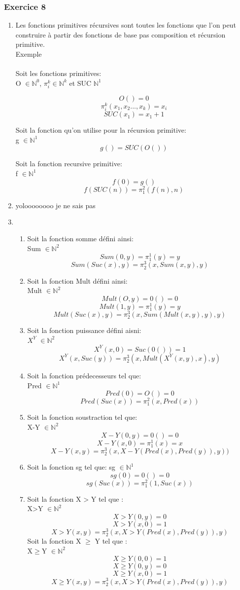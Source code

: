 \documentclass{article}
\begin{document}
\subsubsection{Exercice 8}
\begin{enumerate}
\item Les fonctions primitives récursives sont toutes les fonctions que l'on peut construire à partir des fonctions de base pas composition et récursion primitive.\\

  Exemple\\ \\
Soit les fonctions primitives: \\
O $\in \mathbb{N}^0$, $\pi_i^k \in \mathbb{N}^k$ et SUC $\mathbb{N}^1$ 

 \[O() = 0 \] 
\[\pi_i^k(x_1,x_2...,x_k) = x_i \] 
\[SUC(x_1) = x_1 + 1 \] 

Soit la fonction qu'on utilise pour la récursion primitive:\\
g $\in \mathbb{N}^1$
\[g() = SUC(O()) \]

Soit la fonction recursive primitive:\\
f $\in \mathbb{N}^1$
\[f(0) = g()\]
\[f(SUC(n)) = \pi_1^2(f(n),n)\]
  
\item  yoloooooooo je ne sais pas 
\item \begin{enumerate}\item Soit la fonction somme défini ainsi:\\
 Sum $\in \mathbb{N}^2$ 
\[Sum(0,y) = \pi_1^1(y) = y \]
\[Sum(Suc(x),y) = \pi_2^3(x,Sum(x,y),y)\]
\item Soit la fonction Mult défini ainsi: \\
Mult $\in \mathbb{N}^2$
\[Mult(O,y) = 0() = 0\]
\[Mult(1,y) = \pi_1^1(y) = y\]
\[Mult(Suc(x),y) = \pi_2^3(x,Sum(Mult(x,y),y),y)\]
\item Soit la fonction puissance défini aisni:\\
 $X^Y$ $\in \mathbb{N}^2$
\[X^Y(x,0) = Suc(0()) = 1\]
\[X^Y(x,Suc(y)) = \pi_2^3(x,Mult(X^Y(x,y),x),y)\]
\item Soit la fonction prédecesseurs tel que: \\
Pred $\in \mathbb{N}^1$
\[Pred(0) = O() = 0\]
\[Pred(Suc(x)) = \pi_1^2(x,Pred(x))\]
\item Soit la fonction soustraction tel que:\\
X-Y $\in \mathbb{N}^2$
\[X-Y(0,y) = 0() = 0\]
\[X-Y(x,0) = \pi_1^1(x) = x\]
\[X-Y(x,y) = \pi_2^3(x,X-Y(Pred(x),Pred(y)),y))\]
\item Soit la fonction sg tel que:
sg $\in \mathbb{N}^1$
\[sg(0) = 0() = 0\]
\[sg(Suc(x)) = \pi_1^2(1,Suc(x))\]
\item Soit la fonction X > Y tel que :\\
X>Y $\in \mathbb{N}^2$
\[X>Y(0,y) = 0\]
\[X>Y(x,0) = 1\]
\[X>Y(x,y) = \pi_2^3(x,X>Y(Pred(x),Pred(y)),y)\]
Soit la fonction X $\ge$ Y tel que :\\
X$\ge$Y $\in \mathbb{N}^2$
\[X\ge Y(0,0) = 1\]
\[X\ge Y(0,y) = 0\]
\[X\ge Y(x,0) = 1\]
\[X\ge Y(x,y) = \pi_2^3(x,X>Y(Pred(x),Pred(y)),y)\]


\end{enumerate}
\end{enumerate}
\end{document}
